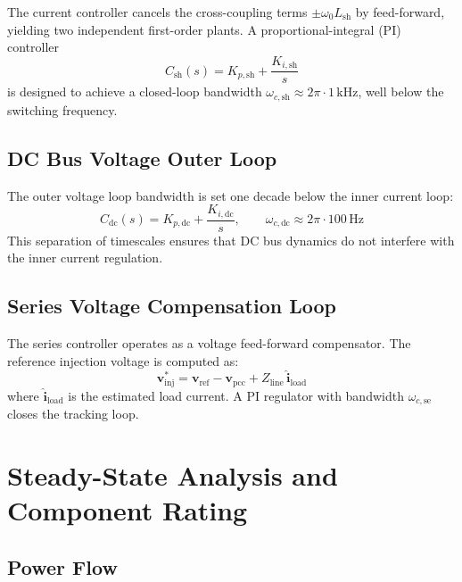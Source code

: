 \documentclass[conference]{IEEEtran}
\begin{document}
The current controller cancels the cross-coupling terms
$\pm\omega_0 L_\text{sh}$ by feed-forward, yielding two independent
first-order plants. A proportional-integral (PI) controller
\begin{equation}
  C_\text{sh}(s) = K_{p,\text{sh}} + \frac{K_{i,\text{sh}}}{s}
  \label{eq:pi_shunt}
\end{equation}
is designed to achieve a closed-loop bandwidth
$\omega_{c,\text{sh}} \approx 2\pi \cdot 1\,\mathrm{kHz}$, well below
the switching frequency.

\subsection{DC Bus Voltage Outer Loop}

The outer voltage loop bandwidth is set one decade below the inner
current loop:
\begin{equation}
  C_\text{dc}(s) = K_{p,\text{dc}} + \frac{K_{i,\text{dc}}}{s},
  \qquad \omega_{c,\text{dc}} \approx 2\pi \cdot 100\,\mathrm{Hz}
  \label{eq:pi_dc}
\end{equation}
This separation of timescales ensures that DC bus dynamics do not
interfere with the inner current regulation.

\subsection{Series Voltage Compensation Loop}

The series controller operates as a voltage feed-forward compensator.
The reference injection voltage is computed as:
\begin{equation}
  \bm{v}_\text{inj}^* = \bm{v}_\text{ref} - \bm{v}_\text{pcc}
                        + Z_\text{line}\,\hat{\bm{i}}_\text{load}
  \label{eq:series_ref}
\end{equation}
where $\hat{\bm{i}}_\text{load}$ is the estimated load current.
A PI regulator with bandwidth $\omega_{c,\text{se}}$ closes the
tracking loop.


\section{Steady-State Analysis and Component Rating}
\label{sec:steadystate}

\subsection{Power Flow}
\end{document}
